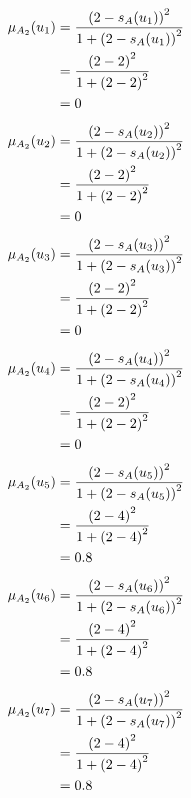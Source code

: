 \documentclass[a4paper,openany]{book}
\begin{document}
				\begin{align}
					\mu_{A_2}(u_1) &= \frac{\left(2-s_A(u_1)\right)^2}{1 + \left(2-s_A(u_1)\right)^2}\\
					&= \frac{\left(2-2\right)^2}{1 + \left(2-2\right)^2} \notag \\
					&= 0 \notag
				\end{align}
				\begin{align}
					\mu_{A_2}(u_2) &= \frac{\left(2-s_A(u_2)\right)^2}{1 + \left(2-s_A(u_2)\right)^2}\\
					&= \frac{\left(2-2\right)^2}{1 + \left(2-2\right)^2} \notag \\
					&= 0 \notag
				\end{align}
				\begin{align}
					\mu_{A_2}(u_3) &= \frac{\left(2-s_A(u_3)\right)^2}{1 + \left(2-s_A(u_3)\right)^2}\\
					&= \frac{\left(2-2\right)^2}{1 + \left(2-2\right)^2} \notag \\
					&= 0 \notag
				\end{align}
				\begin{align}
					\mu_{A_2}(u_4) &= \frac{\left(2-s_A(u_4)\right)^2}{1 + \left(2-s_A(u_4)\right)^2}\\
					&= \frac{\left(2-2\right)^2}{1 + \left(2-2\right)^2} \notag \\
					&= 0 \notag
				\end{align}
				\begin{align}
					\mu_{A_2}(u_5) &= \frac{\left(2-s_A(u_5)\right)^2}{1 + \left(2-s_A(u_5)\right)^2}\\
					&= \frac{\left(2-4\right)^2}{1 + \left(2-4\right)^2} \notag \\
					&= 0.8 \notag
				\end{align}
				\begin{align}
					\mu_{A_2}(u_6) &= \frac{\left(2-s_A(u_6)\right)^2}{1 + \left(2-s_A(u_6)\right)^2}\\
					&= \frac{\left(2-4\right)^2}{1 + \left(2-4\right)^2} \notag \\
					&= 0.8 \notag
				\end{align}
				\begin{align}
					\mu_{A_2}(u_7) &= \frac{\left(2-s_A(u_7)\right)^2}{1 + \left(2-s_A(u_7)\right)^2}\\
					&= \frac{\left(2-4\right)^2}{1 + \left(2-4\right)^2} \notag \\
					&= 0.8 \notag
				\end{align}
\end{document}
